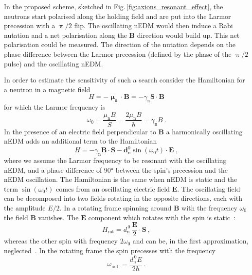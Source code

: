 In the proposed scheme, sketched in Fig.\,\ref{fig:axions_resonant_effect}, the neutrons start polarised along the holding field and are put into the Larmor precession with a $\uppi/2$ flip. The oscillating nEDM would then induce a Rabi nutation and a net polarisation along the $\mathbf{B}$ direction would build up. This net polarisation could be measured. The direction of the nutation depends on the phase difference between the Larmor precession (defined by the phase of the $\uppi/2$ pulse) and the oscillating nEDM\@.

In order to estimate the sensitivity of such a search consider the Hamiltonian for a neutron in a magnetic field
\begin{equation}
  H = - \boldsymbol{\upmu}_\text{n} \cdot \mathbf{B} = - \gamma_\text{n} \mathbf{S} \cdot \mathbf{B}
\end{equation}
for which the Larmor frequency is
\begin{equation}
  \omega_0 = \frac{\mu_\text{n} B}{S} = \frac{2 \mu_\text{n} B}{\hbar} = \gamma_\text{n} B \ .
\end{equation}
In the presence of an electric field perpendicular to $\mathbf{B}$ a harmonically oscillating nEDM adds an additional term to the Hamiltonian
\begin{equation}
  H = - \gamma_\text{n} \mathbf{B} \cdot \mathbf{S} - \mathbf{d}_\text{n}^0 \sin (\omega_0 t) \cdot \mathbf{E} \ ,
\end{equation}
where we assume the Larmor frequency to be resonant with the oscillating nEDM, and a phase difference of \ang{90} between the spin's precession and the nEDM oscillation.
The Hamiltonian is the same when nEDM is static and the term $\sin (\omega_0 t)$ comes from an oscillating electric field $\mathbf{E}$. The oscillating field can be decomposed into two fields rotating in the opposite directions, each with the amplitude $E/2$. In a rotating frame spinning around $\mathbf{B}$ with the frequency $\omega_0$ the field $\mathbf{B}$ vanishes. The $\mathbf{E}$ component which rotates with the spin is static~\cite{RamseyBook}:
\begin{equation}
  H_\text{rot} = d_\text{n}^{\,0} \, \frac{\mathbf{E}}{2} \cdot \mathbf{S} \ ,
\end{equation}
whereas the other spin with frequency $2 \omega_0$ and can be, in the first approximation, neglected~\cite{RamseyBook}.
In the rotating frame the spin precesses with the frequency
\begin{equation}
  \omega_\text{nut.} = \frac{d_\text{n}^{\,0} E }{2 \hbar} \ .
\end{equation}
